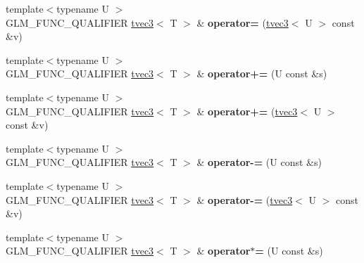 \begin{DoxyCompactItemize}
\item 
\hypertarget{structglm_1_1detail_1_1tvec3_afbea05dd3be1f47275bdec2706235c4d}{{\footnotesize template$<$typename U $>$ }\\G\-L\-M\-\_\-\-F\-U\-N\-C\-\_\-\-Q\-U\-A\-L\-I\-F\-I\-E\-R \hyperlink{structglm_1_1detail_1_1tvec3}{tvec3}$<$ T $>$ \& {\bfseries operator=} (\hyperlink{structglm_1_1detail_1_1tvec3}{tvec3}$<$ U $>$ const \&v)}\label{structglm_1_1detail_1_1tvec3_afbea05dd3be1f47275bdec2706235c4d}

\item 
\hypertarget{structglm_1_1detail_1_1tvec3_a0982080f3d38046a64b8507985b39d95}{{\footnotesize template$<$typename U $>$ }\\G\-L\-M\-\_\-\-F\-U\-N\-C\-\_\-\-Q\-U\-A\-L\-I\-F\-I\-E\-R \hyperlink{structglm_1_1detail_1_1tvec3}{tvec3}$<$ T $>$ \& {\bfseries operator+=} (U const \&s)}\label{structglm_1_1detail_1_1tvec3_a0982080f3d38046a64b8507985b39d95}

\item 
\hypertarget{structglm_1_1detail_1_1tvec3_adf799511f76438da0ef780ff042dc9c0}{{\footnotesize template$<$typename U $>$ }\\G\-L\-M\-\_\-\-F\-U\-N\-C\-\_\-\-Q\-U\-A\-L\-I\-F\-I\-E\-R \hyperlink{structglm_1_1detail_1_1tvec3}{tvec3}$<$ T $>$ \& {\bfseries operator+=} (\hyperlink{structglm_1_1detail_1_1tvec3}{tvec3}$<$ U $>$ const \&v)}\label{structglm_1_1detail_1_1tvec3_adf799511f76438da0ef780ff042dc9c0}

\item 
\hypertarget{structglm_1_1detail_1_1tvec3_a73be343ed604341374da5cae43f58721}{{\footnotesize template$<$typename U $>$ }\\G\-L\-M\-\_\-\-F\-U\-N\-C\-\_\-\-Q\-U\-A\-L\-I\-F\-I\-E\-R \hyperlink{structglm_1_1detail_1_1tvec3}{tvec3}$<$ T $>$ \& {\bfseries operator-\/=} (U const \&s)}\label{structglm_1_1detail_1_1tvec3_a73be343ed604341374da5cae43f58721}

\item 
\hypertarget{structglm_1_1detail_1_1tvec3_aa88a901763b81c379f9cd1ae0ddb14b7}{{\footnotesize template$<$typename U $>$ }\\G\-L\-M\-\_\-\-F\-U\-N\-C\-\_\-\-Q\-U\-A\-L\-I\-F\-I\-E\-R \hyperlink{structglm_1_1detail_1_1tvec3}{tvec3}$<$ T $>$ \& {\bfseries operator-\/=} (\hyperlink{structglm_1_1detail_1_1tvec3}{tvec3}$<$ U $>$ const \&v)}\label{structglm_1_1detail_1_1tvec3_aa88a901763b81c379f9cd1ae0ddb14b7}

\item 
\hypertarget{structglm_1_1detail_1_1tvec3_aa17a935b1c21418e60ddff7d55a96e01}{{\footnotesize template$<$typename U $>$ }\\G\-L\-M\-\_\-\-F\-U\-N\-C\-\_\-\-Q\-U\-A\-L\-I\-F\-I\-E\-R \hyperlink{structglm_1_1detail_1_1tvec3}{tvec3}$<$ T $>$ \& {\bfseries operator$\ast$=} (U const \&s)}\label{structglm_1_1detail_1_1tvec3_aa17a935b1c21418e60ddff7d55a96e01}


\end{DoxyCompactItemize}
